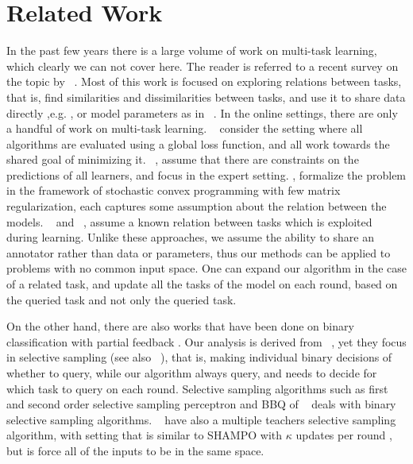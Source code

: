 \chapter{Related Work}

In the past few years there is a large volume of work on multi-task learning, which clearly we can not 
cover here. The reader is referred to a recent survey on the topic by ~\cite{10.1109/TKDE.2009.191}. 
Most of this work is focused on exploring relations between tasks, that is, 
find similarities and dissimilarities  between tasks, and use it to share data directly ,e.g. 
\cite{NIPS2012_0706}, or model parameters as in ~\cite{Evgeniou:2004:RML:1014052.1014067,Daume:2010:FES:1870526.1870534,DBLP:journals/ml/ArgyriouEP08}. 
In the online settings, there are only a handful of work on multi-task learning. 
~\cite{DBLP:conf/colt/DekelLS06} consider the setting where all algorithms are evaluated using a 
global loss function, and all work towards the shared goal of minimizing it. 
~\cite{DBLP:conf/colt/LugosiPS09}, assume that there are constraints on the predictions of all 
learners, and focus in the expert setting. \cite{Agarwal:EECS-2008-138}, formalize the 
problem in the framework of stochastic convex programming with few matrix regularization, each 
captures some assumption about the relation between the models. 
~\cite{DBLP:journals/jmlr/CavallantiCG10} and ~\cite{cesa2006incremental}, 
assume a known relation between tasks which is exploited during learning. 
Unlike these approaches, we assume the ability to share an annotator rather than data or parameters, 
thus our methods can be applied to problems with no common input space. One can 
expand our algorithm in the case of a related task, and update all the tasks of the model  on each round, 
based on the queried task and not only the queried task.

On the other hand, there are also works that have been done on binary classification with partial feedback . 
Our analysis is derived from ~\cite{cesa2006worst}, yet they focus in selective 
sampling (see also ~\cite{cesa2009robust,dekel2010robust,crammer2014doubly}), that is, making individual 
binary decisions of whether to query, while our algorithm always query, and needs to decide for which task 
to query on each round.
Selective sampling algorithms such as first and second order selective sampling perceptron and   
BBQ  of ~\cite{cesa2006worst,cesa2009robust} deals with binary selective 
sampling algorithms. ~\cite{dekel2010robust} have also a multiple teachers selective sampling 
algorithm, with setting that is similar to SHAMPO with $\kappa$ updates per round , but is force all of the 
inputs to be in the same space.

